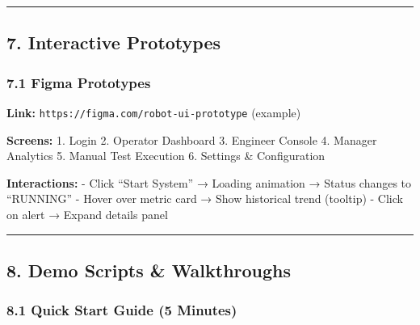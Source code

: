 \documentclass[
]{article}
\begin{document}
\begin{center}\rule{0.5\linewidth}{0.5pt}\end{center}

\hypertarget{interactive-prototypes}{%
\subsection{7. Interactive Prototypes}\label{interactive-prototypes}}

\hypertarget{figma-prototypes}{%
\subsubsection{7.1 Figma Prototypes}\label{figma-prototypes}}

\textbf{Link:} \texttt{https://figma.com/robot-ui-prototype} (example)

\textbf{Screens:} 1. Login 2. Operator Dashboard 3. Engineer Console 4.
Manager Analytics 5. Manual Test Execution 6. Settings \& Configuration

\textbf{Interactions:} - Click ``Start System'' → Loading animation →
Status changes to ``RUNNING'' - Hover over metric card → Show historical
trend (tooltip) - Click on alert → Expand details panel

\begin{center}\rule{0.5\linewidth}{0.5pt}\end{center}

\hypertarget{demo-scripts-walkthroughs}{%
\subsection{8. Demo Scripts \&
Walkthroughs}\label{demo-scripts-walkthroughs}}

\hypertarget{quick-start-guide-5-minutes}{%
\subsubsection{8.1 Quick Start Guide (5
Minutes)}\label{quick-start-guide-5-minutes}}
\end{document}
